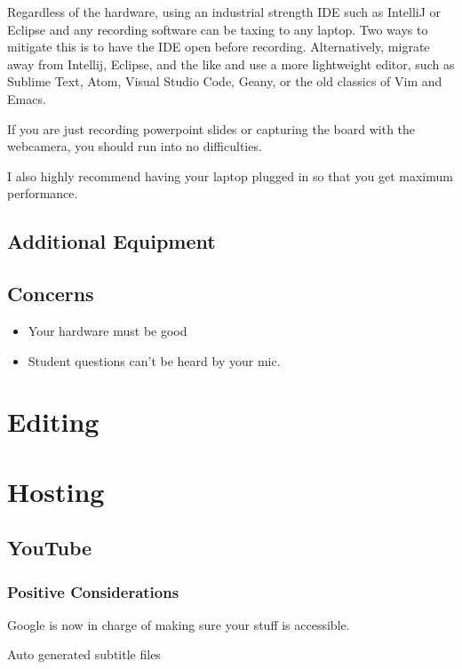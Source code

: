 \documentclass[sigconf]{acmart}
\begin{document}
Regardless of the hardware, using an industrial strength IDE such as IntelliJ or Eclipse and any recording software can be taxing to any laptop.
Two ways to mitigate this is to have the IDE open before recording.
Alternatively, migrate away from Intellij, Eclipse, and the like and use a more lightweight editor, such as Sublime Text, Atom, Visual Studio Code, Geany, or the old classics of Vim and Emacs.



If you are just recording powerpoint slides or capturing the board with the webcamera, you should run into no difficulties.

I also highly recommend having your laptop plugged in  so that you get maximum performance.

\subsection{Additional Equipment}



\subsection{Concerns}
\begin{itemize}
	\item Your hardware must be good
	\item Student questions can't be heard by your mic.
\end{itemize}

\section{Editing}

\section{Hosting}

\subsection{YouTube}


\subsubsection{Positive Considerations}
Google is now in charge of making sure your stuff is accessible.



Auto generated subtitle files
\end{document}
